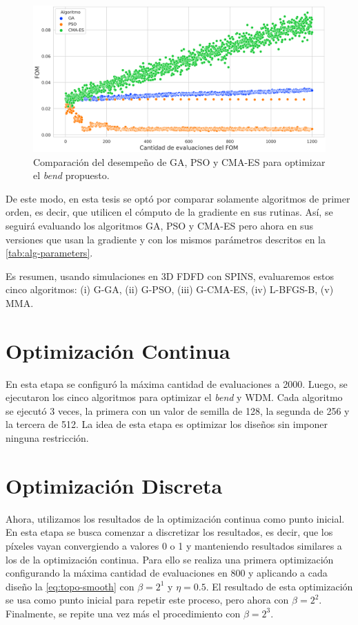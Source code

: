 \begin{figure}[ht]
  \centering
  \includegraphics[width=1.0\textwidth]{image/proposal/bend-opt-cont.png}
  \caption{Comparación del desempeño de GA, PSO y CMA-ES para optimizar el \emph{bend} propuesto.}
  \label{fig:gradient-free-comparison}
\end{figure}


De este modo, en esta tesis se optó por comparar solamente algoritmos de primer orden, es decir, que utilicen
el cómputo de la gradiente en sus rutinas. Así, se seguirá evaluando los algoritmos GA, PSO y CMA-ES pero
ahora en sus versiones que usan la gradiente y con los mismos parámetros descritos en la
\autoref{tab:alg-parameters}. 

Es resumen, usando simulaciones en 3D FDFD con SPINS, evaluaremos estos cinco algoritmos: (i) G-GA, (ii) G-PSO, (iii) G-CMA-ES, (iv) L-BFGS-B, (v) MMA.

\section{Optimización Continua}

En esta etapa se configuró la máxima cantidad de evaluaciones a 2000.
Luego, se ejecutaron los cinco algoritmos para optimizar el \emph{bend} y WDM.
Cada algoritmo se ejecutó 3 veces, la primera con un valor de semilla de 128, la segunda de 256 y
la tercera de 512.
La idea de esta etapa es optimizar los diseños sin imponer ninguna restricción.

\section{Optimización Discreta}

Ahora, utilizamos los resultados de la optimización continua como punto inicial.
En esta etapa se busca comenzar a discretizar los resultados, es decir, que los píxeles vayan convergiendo
a valores 0 o 1 y manteniendo resultados similares a los de la optimización continua.
Para ello se realiza una primera optimización configurando la máxima cantidad de evaluaciones 
en 800 y aplicando a cada diseño la \autoref{eq:topo-smooth} con $\beta = 2^1$ y $\eta = 0.5$.
El resultado de esta optimización se usa como punto inicial para repetir este proceso, pero ahora con $\beta
= 2^2$. Finalmente, se repite una vez más el procedimiento con $\beta = 2^3$.


